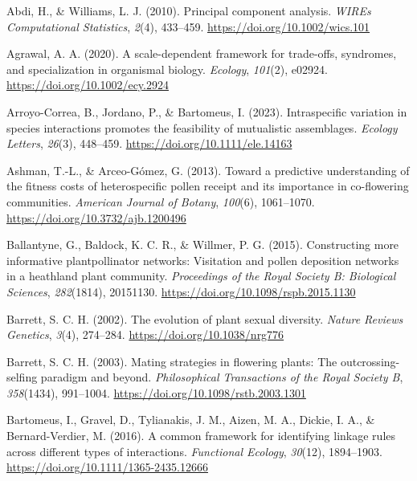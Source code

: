 \documentclass[
  12pt,
  a4paper,
]{article}
\newlength{\cslhangindent}
\newlength{\cslentryspacingunit} %
\newenvironment{CSLReferences}[2] %
 {%
  \setlength{\parindent}{0pt}
  \ifodd #1
  \let\oldpar\par
  \def\par{\hangindent=\cslhangindent\oldpar}
  \fi
  \setlength{\parskip}{#2\cslentryspacingunit}
 }%
 {}
\begin{document}
\hypertarget{refs}{}
\begin{CSLReferences}{1}{0}
\leavevmode{}%
Abdi, H., \& Williams, L. J. (2010). Principal component analysis. \emph{WIREs Computational Statistics}, \emph{2}(4), 433--459. \url{https://doi.org/10.1002/wics.101}

\leavevmode{}%
Agrawal, A. A. (2020). A scale-dependent framework for trade-offs, syndromes, and specialization in organismal biology. \emph{Ecology}, \emph{101}(2), e02924. \url{https://doi.org/10.1002/ecy.2924}

\leavevmode{}%
Arroyo-Correa, B., Jordano, P., \& Bartomeus, I. (2023). Intraspecific variation in species interactions promotes the feasibility of mutualistic assemblages. \emph{Ecology Letters}, \emph{26}(3), 448--459. \url{https://doi.org/10.1111/ele.14163}

\leavevmode{}%
Ashman, T.-L., \& Arceo-Gómez, G. (2013). Toward a predictive understanding of the fitness costs of heterospecific pollen receipt and its importance in co-flowering communities. \emph{American Journal of Botany}, \emph{100}(6), 1061--1070. \url{https://doi.org/10.3732/ajb.1200496}

\leavevmode{}%
Ballantyne, G., Baldock, K. C. R., \& Willmer, P. G. (2015). Constructing more informative plant\textendash pollinator networks: Visitation and pollen deposition networks in a heathland plant community. \emph{Proceedings of the Royal Society B: Biological Sciences}, \emph{282}(1814), 20151130. \url{https://doi.org/10.1098/rspb.2015.1130}

\leavevmode{}%
Barrett, S. C. H. (2002). The evolution of plant sexual diversity. \emph{Nature Reviews Genetics}, \emph{3}(4), 274--284. \url{https://doi.org/10.1038/nrg776}

\leavevmode{}%
Barrett, S. C. H. (2003). Mating strategies in flowering plants: The outcrossing-selfing paradigm and beyond. \emph{Philosophical Transactions of the Royal Society B}, \emph{358}(1434), 991--1004. \url{https://doi.org/10.1098/rstb.2003.1301}

\leavevmode{}%
Bartomeus, I., Gravel, D., Tylianakis, J. M., Aizen, M. A., Dickie, I. A., \& Bernard-Verdier, M. (2016). A common framework for identifying linkage rules across different types of interactions. \emph{Functional Ecology}, \emph{30}(12), 1894--1903. \url{https://doi.org/10.1111/1365-2435.12666}


\end{CSLReferences}
\end{document}

